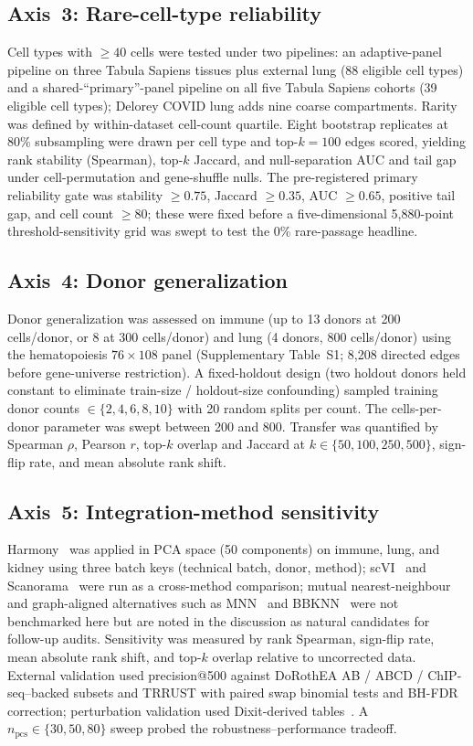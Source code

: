 \documentclass[12pt]{article}
\begin{document}
\subsection{Axis~3: Rare-cell-type reliability}

Cell types with $\geq 40$ cells were tested under two pipelines: an
adaptive-panel pipeline on three Tabula Sapiens tissues plus external
lung (88 eligible cell types) and a shared-``primary''-panel pipeline
on all five Tabula Sapiens cohorts (39 eligible cell types); Delorey
COVID lung adds nine coarse compartments. Rarity was defined by
within-dataset cell-count quartile. Eight bootstrap replicates at 80\%
subsampling were drawn per cell type and top-$k = 100$ edges scored,
yielding rank stability (Spearman), top-$k$ Jaccard, and
null-separation AUC and tail gap under cell-permutation and
gene-shuffle nulls. The pre-registered primary reliability gate was
stability $\geq 0.75$, Jaccard $\geq 0.35$, AUC $\geq 0.65$, positive
tail gap, and cell count $\geq 80$; these were fixed before a
five-dimensional 5{,}880-point threshold-sensitivity grid was swept
to test the 0\% rare-passage headline.

\subsection{Axis~4: Donor generalization}

Donor generalization was assessed on immune (up to 13 donors at 200
cells/donor, or 8 at 300 cells/donor) and lung (4 donors, 800
cells/donor) using the hematopoiesis $76 \times 108$ panel
(Supplementary Table~S1; 8{,}208 directed edges before gene-universe
restriction). A fixed-holdout design (two holdout donors held constant
to eliminate train-size / holdout-size confounding) sampled training
donor counts $\in \{2, 4, 6, 8, 10\}$ with 20 random splits per count.
The cells-per-donor parameter was swept between 200 and 800. Transfer
was quantified by Spearman $\rho$, Pearson $r$, top-$k$ overlap and
Jaccard at $k \in \{50, 100, 250, 500\}$, sign-flip rate, and mean
absolute rank shift.

\subsection{Axis~5: Integration-method sensitivity}

Harmony~\citep{Korsunsky2019} was applied in PCA space (50 components)
on immune, lung, and kidney using three batch keys (technical batch,
donor, method); scVI~\citep{Gayoso2022} and Scanorama~\citep{Hie2019}
were run as a cross-method comparison; mutual nearest-neighbour and
graph-aligned alternatives such as MNN~\citep{Haghverdi2018} and
BBKNN~\citep{Polanski2020} were not benchmarked here but are noted in
the discussion as natural candidates for follow-up audits. Sensitivity was measured by
rank Spearman, sign-flip rate, mean absolute rank shift, and top-$k$
overlap relative to uncorrected data. External validation used
precision@500 against DoRothEA AB / ABCD / ChIP-seq--backed subsets
and TRRUST with paired swap binomial tests and BH-FDR correction;
perturbation validation used Dixit-derived
tables~\citep{Dixit2016}. A $n_{\text{pcs}} \in \{30, 50, 80\}$ sweep
probed the robustness--performance tradeoff.
\end{document}
